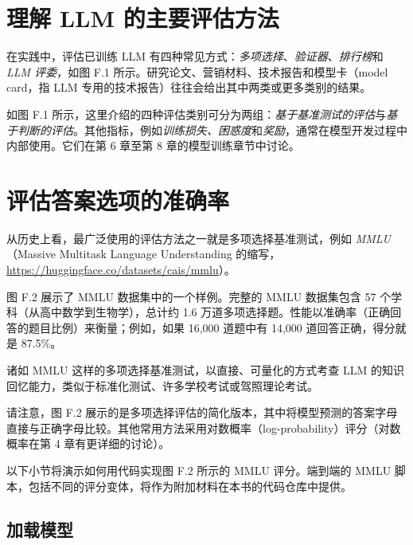 \section{理解 LLM 的主要评估方法}

在实践中，评估已训练 LLM 有四种常见方式：\emph{多项选择}、\emph{验证器}、\emph{排行榜}和 \emph{LLM 评委}，如图 F.1 所示。研究论文、营销材料、技术报告和模型卡（model card，指 LLM 专用的技术报告）往往会给出其中两类或更多类别的结果。


如图 F.1 所示，这里介绍的四种评估类别可分为两组：\emph{基于基准测试的评估}与\emph{基于判断的评估}。其他指标，例如\emph{训练损失、困惑度}和\emph{奖励}，通常在模型开发过程中内部使用。它们在第 6 章至第 8 章的模型训练章节中讨论。

\section{评估答案选项的准确率}

从历史上看，最广泛使用的评估方法之一就是多项选择基准测试，例如 \emph{MMLU}（Massive Multitask Language Understanding 的缩写，\href{https://huggingface.co/datasets/cais/mmlu}{https://huggingface.co/datasets/cais/mmlu}）。

图 F.2 展示了 MMLU 数据集中的一个样例。完整的 MMLU 数据集包含 57 个学科（从高中数学到生物学），总计约 1.6 万道多项选择题。性能以准确率（正确回答的题目比例）来衡量；例如，如果 16,000 道题中有 14,000 道回答正确，得分就是 87.5\%。


诸如 MMLU 这样的多项选择基准测试，以直接、可量化的方式考查 LLM 的知识回忆能力，类似于标准化测试、许多学校考试或驾照理论考试。

请注意，图 F.2 展示的是多项选择评估的简化版本，其中将模型预测的答案字母直接与正确字母比较。其他常用方法采用对数概率（log-probability）评分（对数概率在第 4 章有更详细的讨论）。

以下小节将演示如何用代码实现图 F.2 所示的 MMLU 评分。端到端的 MMLU 脚本，包括不同的评分变体，将作为附加材料在本书的代码仓库中提供。

\subsection{加载模型}

